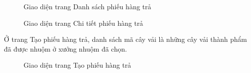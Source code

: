 \begin{figure}[H]
    \begin{center}
        \caption{Giao diện trang Danh sách phiếu hàng trả}
        \label{result_danh_sach_hang_tra}
    \end{center}
\end{figure}

\begin{figure}[H]
    \begin{center}
        \caption{Giao diện trang Chi tiết phiếu hàng trả}
        \label{result_chi_tiet_hang_tra}
    \end{center}
\end{figure}

Ở trang Tạo phiếu hàng trả, danh sách mã cây vải là những cây vải thành phẩm đã được nhuộm ở xưởng nhuộm đã chọn. \par

\begin{figure}[H]
    \begin{center}
        \caption{Giao diện trang Tạo phiếu hàng trả}
        \label{result_tao_hang_tra}
    \end{center}
\end{figure}

